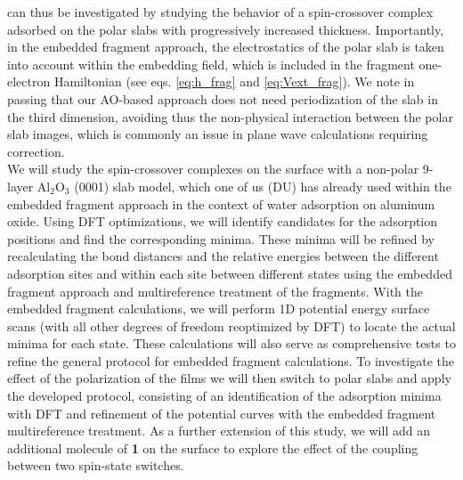\documentclass[a4paper,11pt,headings=normal]{scrartcl}
\begin{document}
\begin{itemize}
can thus be investigated by studying the behavior of a spin-crossover complex 
adsorbed on the polar slabs with progressively increased thickness. 
Importantly, in the embedded fragment approach, the electrostatics of the polar 
slab is taken into account within the embedding field, which is included in the 
fragment one-electron Hamiltonian (see eqs. \eqref{eq:h_frag} and 
\eqref{eq:Vext_frag}). We note in passing that our AO-based approach does not 
need periodization of the slab in the third dimension, avoiding thus the 
non-physical interaction between the polar slab images, which is commonly an 
issue in plane wave calculations requiring correction.\\
We will study the spin-crossover complexes on the surface with a 
non-polar 9-layer Al$_2$O$_3$ (0001) slab model, which one of us (DU) has 
already used within the embedded fragment approach in the context of water 
adsorption on aluminum oxide.\autocite{lmp2_al2o3, mullan21} Using DFT 
optimizations, we will identify candidates for the adsorption positions and 
find the corresponding minima. These minima will be refined by recalculating the 
bond distances and the relative energies between the different adsorption sites 
and within each site between different states using the embedded fragment 
approach and multireference treatment of the fragments. With the embedded 
fragment calculations, we will perform 1D potential energy surface scans (with 
all other degrees of freedom reoptimized by DFT) to locate the actual minima 
for each state. These calculations will also serve as comprehensive tests to 
refine the general protocol for embedded fragment calculations.
To investigate the effect of the polarization of the films we will 
then switch to polar slabs and apply the developed protocol, consisting of an 
identification of the adsorption minima with DFT and refinement of the 
potential curves with the embedded fragment multireference treatment. As a
further extension of this study, we will add an additional molecule of 
\textbf{1} on the surface to explore the effect of the coupling between two 
spin-state switches.\\ 

\end{itemize}
\end{document}
